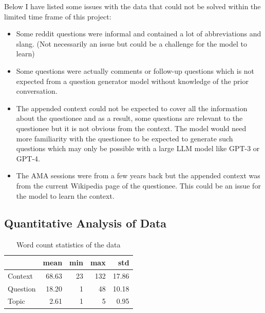 \documentclass[paper=a4, fontsize=11pt]{scrartcl}
\numberwithin{equation}{section}		%
\numberwithin{figure}{section}			%
\numberwithin{table}{section}				%
\begin{document}
Below I have listed some issues with the data that could not be solved within the limited time frame of this project:
\begin{itemize}
  \item Some reddit questions were informal and contained a lot of abbreviations and slang. (Not necessarily an issue but could be a challenge for the model to learn)
  \item Some questions were actually comments or follow-up questions which is not expected from a question generator model without knowledge of the prior conversation.
  \item The appended context could not be expected to cover all the information about the questionee and as a result, some questions are relevant to the questionee but it is not obvious from the context. The model would need more familiarity with the questionee to be expected to generate such questions which may only be possible with a large LLM model like GPT-3 or GPT-4.
  \item The AMA sessions were from a few years back but the appended context was from the current Wikipedia page of the questionee. This could be an issue for the model to learn the context.
\end{itemize}

\subsection*{Quantitative Analysis of Data}
\begin{table}[h]
  \small
  \centering
  \begin{tabular}{lrrrr}
    \hline
     & mean & min & max & std \\
    \hline
    Context & 68.63 & 23 & 132 & 17.86 \\
    Question & 18.20 & 1 & 48 & 10.18 \\
    Topic & 2.61 & 1 & 5 & 0.95 \\
    \hline
    \end{tabular}
    \caption{Word count statistics of the data}
    \label{tab:data_stats}
\end{table}
\end{document}
